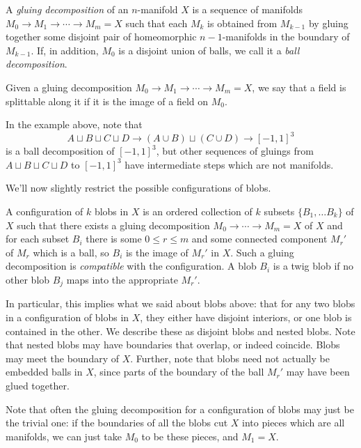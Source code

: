 \begin{defn}
\label{defn:gluing-decomposition}
A \emph{gluing decomposition} of an $n$-manifold $X$ is a sequence of manifolds 
$M_0 \to M_1 \to \cdots \to M_m = X$ such that each $M_k$ is obtained from $M_{k-1}$ 
by gluing together some disjoint pair of homeomorphic $n{-}1$-manifolds in the boundary of $M_{k-1}$.
If, in addition, $M_0$ is a disjoint union of balls, we call it a \emph{ball decomposition}.
\end{defn}
Given a gluing decomposition $M_0 \to M_1 \to \cdots \to M_m = X$, we say that a field is splittable along it if it is the image of a field on $M_0$.

In the example above, note that $$A \sqcup B \sqcup C \sqcup D \to (A \cup B) \sqcup (C \cup D) \to [-1,1]^3$$ is a  ball decomposition of $[-1,1]^3$, but other sequences of gluings from $A \sqcup B \sqcup C \sqcup D$ to $[-1,1]^3$ have intermediate steps which are not manifolds.

We'll now slightly restrict the possible configurations of blobs.
\begin{defn}
\label{defn:configuration}
A configuration of $k$ blobs in $X$ is an ordered collection of $k$ subsets $\{B_1, \ldots B_k\}$ of $X$ such that there exists a gluing decomposition $M_0  \to \cdots \to M_m = X$ of $X$ and for each subset $B_i$ there is some $0 \leq r \leq m$ and some connected component $M_r'$ of $M_r$ which is a ball, so $B_i$ is the image of $M_r'$ in $X$. Such a gluing decomposition is \emph{compatible} with the configuration. A blob $B_i$ is a twig blob if no other blob $B_j$ maps into the appropriate $M_r'$. 
\end{defn}
In particular, this implies what we said about blobs above: 
that for any two blobs in a configuration of blobs in $X$, 
they either have disjoint interiors, or one blob is contained in the other. 
We describe these as disjoint blobs and nested blobs. 
Note that nested blobs may have boundaries that overlap, or indeed coincide. 
Blobs may meet the boundary of $X$.
Further, note that blobs need not actually be embedded balls in $X$, since parts of the boundary of the ball $M_r'$ may have been glued together.

Note that often the gluing decomposition for a configuration of blobs may just be the trivial one: if the boundaries of all the blobs cut $X$ into pieces which are all manifolds, we can just take $M_0$ to be these pieces, and $M_1 = X$.

